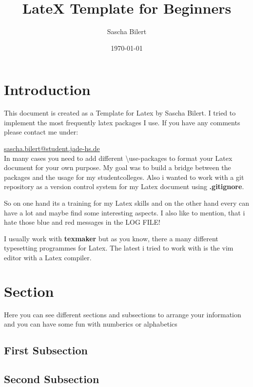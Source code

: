 \documentclass[11pt, a4paper]{article}
\begin{document}
\title{LateX Template for Beginners}
\author{Sascha Bilert}
\date{\today}
\maketitle
\thispagestyle{empty}
\tableofcontents

\pagebreak


\section{Introduction}

This document is created as a Template for Latex by Sascha Bilert. I tried to implement the most frequently latex packages I use. If you have any comments please contact me under:

\href{mailto:sascha.bilert@student.jade-hs.de}{sascha.bilert@student.jade-hs.de}\\
In many cases you need to add different \textbackslash use-packages to format your Latex document for your own purpose. My goal was to build a bridge between the packages and the usage for my studentcolleges. Also i wanted to work with a git repository as a version control system for my Latex document using \textbf{.gitignore}.

So on one hand its a training for my Latex skills and on the other hand every can have a lot and maybe find some interesting aspects. I also like to mention, that i hate those {\color{blue}blue} and {\color{red}red} messages in the LOG FILE!

I usually work with \textbf{texmaker} but as you know, there a many different typesetting programmes for Latex. The latest i tried to work with is the vim editor with a Latex compiler.

\section{Section}

Here you can see different sections and subsections to arrange your information and you can have some fun with numberics or alphabetics

\subsection{First Subsection}

\subsection{Second Subsection}
\end{document}
